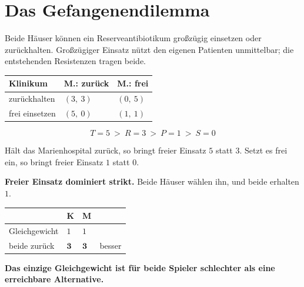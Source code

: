 \section{Das Gefangenendilemma}

\begin{merksatz}
Beide Häuser können ein Reserveantibiotikum großzügig einsetzen oder zurückhalten. Großzügiger Einsatz nützt den eigenen Patienten unmittelbar; die entstehenden Resistenzen tragen beide.

\begin{center}
{\small
\renewcommand{\arraystretch}{1.6}
\begin{tabular}{@{}P{2.6cm}P{2.4cm}P{2.4cm}@{}}
\toprule
\textbf{Klinikum} & \textbf{M.: zurück} & \textbf{M.: frei}\\
\midrule
zurückhalten & $(3,\ 3)$ & $(0,\ 5)$\\
frei einsetzen & $(5,\ 0)$ & $(1,\ 1)$\\
\bottomrule
\end{tabular}}
\end{center}

\[ T = 5 \ >\ R = 3 \ >\ P = 1 \ >\ S = 0 \]

 Hält das Marienhospital zurück, so bringt freier Einsatz $5$ statt $3$. Setzt es frei ein, so bringt freier Einsatz $1$ statt $0$.

\begin{center}
\begin{minipage}{0.9\textwidth}
\textbf{Freier Einsatz dominiert strikt.} Beide Häuser wählen ihn, und beide erhalten $1$.
\end{minipage}
\end{center}

\begin{center}
{\small
\renewcommand{\arraystretch}{1.5}
\begin{tabular}{@{}P{2.8cm}P{2.0cm}P{2.0cm}P{1.6cm}@{}}
\toprule
& \textbf{K} & \textbf{M} & \\
\midrule
Gleichgewicht & $1$ & $1$ & \\
beide zurück & $\mathbf{3}$ & $\mathbf{3}$ & \textcolor{gruen}{besser}\\
\bottomrule
\end{tabular}}
\end{center}

\begin{center}
\begin{minipage}{0.9\textwidth}
\textbf{Das einzige Gleichgewicht ist für beide Spieler schlechter als eine erreichbare Alternative.}
\end{minipage}
\end{center}


\end{merksatz}
